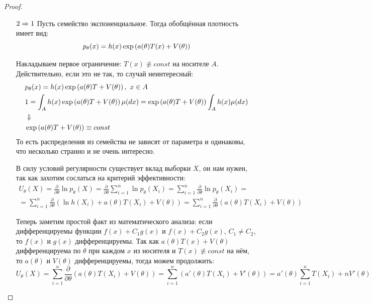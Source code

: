 \begin{proof}~
    \begin{itemize}
        \item[$2 \Rightarrow 1$] Пусть семейство экспоненциальное. Тогда обобщённая плотность имеет вид:
        \[
            p_\theta(x) = h(x) \exp \left(a(\theta) T(x) + V(\theta)\right)
        \]

        Накладываем первое ограничение: $T(x) \not\equiv const$ на носителе $A$. Действительно, если это не так, то случай неинтересный:
        \begin{align*}
            & p_\theta(x) = h(x) \exp \ps{a(\theta) T + V(\theta)},\ x \in A
            \\
            & 1 = \int_A h(x) \exp \ps{a(\theta) T + V(\theta)} \mu(dx) = \exp \ps{a(\theta) T + V(\theta)} \int_A h(x) \mu(dx)
            \\
            & \Downarrow
            \\
            & \exp \ps{a(\theta) T + V(\theta)} \equiv const
        \end{align*}
        То есть распределения из семейства не зависят от параметра и одинаковы, что несколько странно и не очень интересно.

        В силу условий регулярности существует вклад выборки $X$, он нам нужен, так как захотим сослаться на критерий эффективности:
        \begin{multline*}
            U_\theta(X) = \frac{\partial}{\partial \theta} \ln p_\theta(X) = \frac{\partial}{\partial \theta} \sum_{i=1}^n \ln p_\theta(X_i) = \sum_{i=1}^n \frac{\partial}{\partial \theta} \ln p_\theta(X_i) =
            \\
            = \sum_{i=1}^n \frac{\partial}{\partial \theta} (\ln h(X_i) + a(\theta) T(X_i) + V(\theta)) = \sum_{i=1}^n \frac{\partial}{\partial \theta} (a(\theta) T(X_i) + V(\theta))
        \end{multline*}

        Теперь заметим простой факт из математического анализа: если дифференцируемы функции $f(x) + C_1 g(x)$ и $f(x) + C_2 g(x)$, $C_1 \neq C_2$, то $f(x)$ и $g(x)$ дифференцируемы. Так как $a(\theta) T(x) + V(\theta)$ дифференцируема по $\theta$ при каждом $x$ из носителя и $T(x) \not\equiv const$ на нём, то $a(\theta)$ и $V(\theta)$ дифференцируемы, тогда можем продолжить:
        \[
            U_\theta(X) = \sum_{i=1}^n \frac{\partial}{\partial \theta} (a(\theta) T(X_i) + V(\theta)) = \sum_{i=1}^n (a'(\theta) T(X_i) + V'(\theta)) = a'(\theta) \sum_{i=1}^n T(X_i) + n V'(\theta)
        \]


\end{itemize}
\end{proof}
